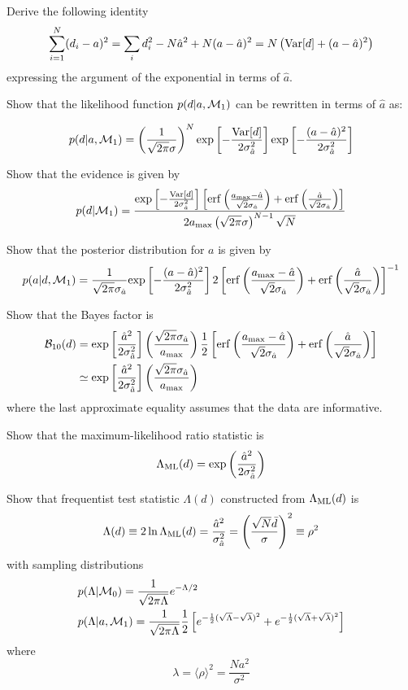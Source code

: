 \documentclass[11pt]{article}
\def\be{\begin{equation}}
\def\ee{\end{equation}}
\def\i{\item{}}
\begin{document}
\item
Derive the following identity
%
\be
\sum_{i=1}^N(d_i-a)^2 =\sum_i d_i^2 - N\hat a^2+N(a-\hat a)^2
= N\left({\rm Var}[d] + (a-\hat a)^2\right)
\ee
%
expressing the argument of the exponential in terms of $\hat a$.

\item
Show that the likelihood function $p(d|a,{\cal M}_1)$ can be
rewritten in terms of $\hat a$ as:

\be
p(d|a,{\cal M}_1)=\left(\frac{1}{\sqrt{2\pi}\sigma}\right)^N
{\rm exp}\left[-\frac{{\rm Var}[d]}{2\sigma^2_{\hat a}}\right]
{\rm exp}\left[-\frac{(a-\hat a)^2}{2\sigma^2_{\hat a}}\right]
\ee
%

\i Show that the evidence is given by
%
\be
p(d|{\cal M}_1)=
\frac{{\rm exp}\left[-\frac{{\rm Var}[d]}{2\sigma^2_{\hat a}}\right]
\left[
{\rm erf}\left(\frac{a_{\rm max}-\hat a}{\sqrt{2}\sigma_{\hat a}}\right) +
{\rm erf}\left(\frac{\hat a}{\sqrt{2}\sigma_{\hat a}}\right) 
\right]}
{2a_{\rm max}\left(\sqrt{2\pi}\sigma\right)^{N-1}\sqrt{N}}
\ee
%

\item
Show that the posterior distribution for $a$ is given by
%
\be
p(a|d,{\cal M}_1)=\frac{1}{\sqrt{2\pi}\sigma_{\hat a}}{\rm exp}\left[-\frac{(a-\hat a)^2}{2\sigma^2_{\hat a}}\right]
2\left[
{\rm erf}\left(\frac{a_{\rm max}-\hat a}{\sqrt{2}\sigma_{\hat a}}\right) +
{\rm erf}\left(\frac{\hat a}{\sqrt{2}\sigma_{\hat a}}\right) 
\right]^{-1}
\ee
%

\item
Show that the Bayes factor is
%
\be
\begin{aligned}
{\cal B}_{10}(d) &= {\rm exp}\left[\frac{\hat a^2}{2\sigma^2_{\hat a}}\right]
\left(\frac{\sqrt{2\pi}\sigma_{\hat a}}{a_{\rm max}}\right)
\frac{1}{2}\left[
{\rm erf}\left(\frac{a_{\rm max}-\hat a}{\sqrt{2}\sigma_{\hat a}}\right) +
{\rm erf}\left(\frac{\hat a}{\sqrt{2}\sigma_{\hat a}}\right) 
\right]
\\
&\simeq {\rm exp}\left[\frac{\hat a^2}{2\sigma^2_{\hat a}}\right]
\left(\frac{\sqrt{2\pi}\sigma_{\hat a}}{a_{\rm max}}\right)
\end{aligned}
\ee
%
where the last approximate equality assumes that the data are informative.

\item
Show that the maximum-likelihood ratio statistic is
%
\be
\Lambda_{\rm ML}(d) = {\rm exp}\left(\frac{\hat a^2}{2\sigma^2_{\hat a}}\right)
\ee
%

\item
Show that frequentist test statistic $\Lambda(d)$ constructed from $\Lambda_{\rm ML}(d)$ is
%
\be
\Lambda(d) \equiv 2\ln \Lambda_{\rm ML}(d) = \frac{\hat a^2}{\sigma^2_{\hat a}} = \left(\frac{\sqrt{N}\bar d}{\sigma}\right)^2 \equiv \rho^2
\ee
%
with sampling distributions
%
\begin{align}
&p(\Lambda|{\cal M}_0) =\frac{1}{\sqrt{2\pi\Lambda}}e^{-\Lambda/2}
\\
&p(\Lambda|a,{\cal M}_1) =\frac{1}{\sqrt{2\pi\Lambda}}\frac{1}{2}\left[
e^{-\frac{1}{2}(\sqrt{\Lambda}-\sqrt{\lambda})^2}
+e^{-\frac{1}{2}(\sqrt{\Lambda}+\sqrt{\lambda})^2}
\right]
\end{align}
%
where
%
\be
\lambda=
\langle\rho\rangle^2=\frac{Na^2}{\sigma^2}
\ee
\end{document}
